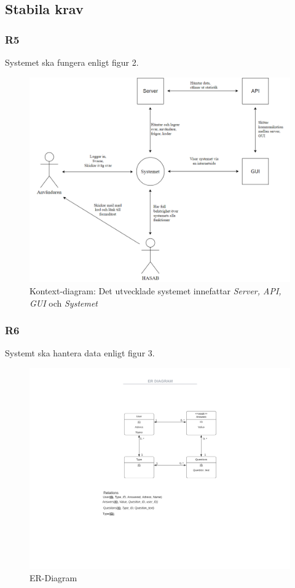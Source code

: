 \documentclass{article}
\begin{document}
    \subsection*{Stabila krav}
    \subsubsection*{R5}
    Systemet ska fungera enligt figur 2.
    
    \begin{figure}[h!]
    \caption{Kontext-diagram: Det utvecklade systemet innefattar \textit{Server, API, GUI} och \textit{Systemet}}
    \includegraphics[width=150mm]{Kontextdiagram.png}
    
    \end{figure}
    
    \newpage
    \subsubsection*{R6}
    Systemt ska hantera data enligt figur 3.
       \begin{figure}[h!]
    
    \includegraphics[width=150mm]{ERDIAGRAM.png}
    \caption{ER-Diagram}
    \end{figure}
    
\end{document}
